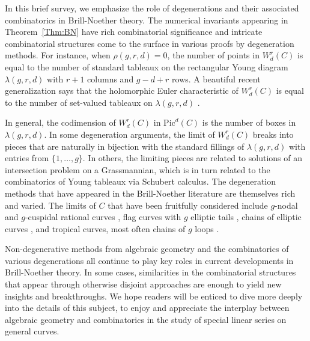 \documentclass{amsart}
\theoremstyle{definition}
\begin{document}
In this brief survey, we emphasize the role of degenerations and their associated combinatorics in Brill-Noether theory.  The numerical invariants appearing in Theorem~\ref{Thm:BN} have rich combinatorial significance and intricate combinatorial structures come to the surface in various proofs by degeneration methods.  For instance, when $\rho(g,r,d) = 0$, the number of points in $W^r_d(C)$ is equal to the number of standard tableaux on the rectangular Young diagram $\lambda(g,r,d)$ with $r+1$ columns and $g-d+r$ rows.  A beautiful recent generalization says that the holomorphic Euler characteristic of $W^r_d (C)$ is equal to the number of set-valued tableaux on $\lambda(g,r,d)$ \cite{ACT21, CP21}.

In general, the codimension of $W^r_d(C)$ in $\mathrm{Pic}^d(C)$ is the number of boxes in $\lambda(g,r,d)$. In some degeneration arguments, the limit of $W^r_d(C)$ breaks into pieces that are naturally in bijection with the standard fillings of $\lambda(g,r,d)$ with entries from $\{1, \ldots, g \}$. In others, the limiting pieces are related to solutions of an intersection problem on a Grassmannian, which is in turn related to the combinatorics of Young tableaux via Schubert calculus. The degeneration methods that have appeared in the Brill-Noether literature are themselves rich and varied. The limits of $C$ that have been fruitfully considered include $g$-nodal \cite{GriffithsHarris80, Gieseker82} and $g$-cuspidal rational curves \cite{EisenbudHarris83b}, flag curves with $g$ elliptic tails \cite{EisenbudHarris83c, EisenbudHarris87}, chains of elliptic curves \cite{Osserman14}, and tropical curves, most often chains of $g$ loops \cite{tropicalBN, tropicalGP}.  

Non-degenerative methods from algebraic geometry and the combinatorics of various  degenerations all continue to play key roles in current developments in Brill-Noether theory. In some cases, similarities in the combinatorial structures that appear through otherwise disjoint approaches are enough to yield new insights and breakthroughs. We hope readers will be enticed to dive more deeply into the details of this subject, to enjoy and appreciate the interplay between algebraic geometry and combinatorics in the study of special linear series on general curves.
\end{document}
